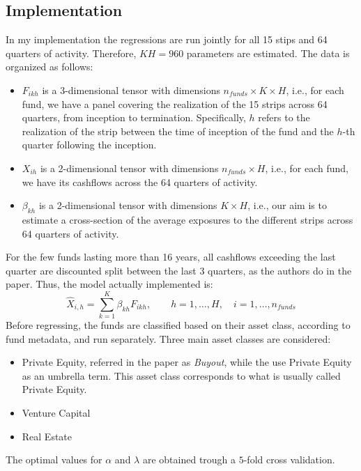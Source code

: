 \documentclass[12pt]{article}
\begin{document}
    \subsection{Implementation}\label{subsec:implementation}
    In my implementation the regressions are run jointly for all 15 stips and 64 quarters of activity.
    Therefore, $KH=960$ parameters are estimated.
    The data is organized as follows:
    \begin{itemize}
        \item $F_{ikh}$ is a 3-dimensional tensor with dimensions $n_{funds} \times K \times H$, i.e., for each fund, we have a panel covering the realization of the 15 strips across 64 quarters, from inception to termination. Specifically, $h$ refers to the realization of the strip between the time of inception of the fund and the $h$-th quarter following the inception.
        \item $X_{ih}$ is a 2-dimensional tensor with dimensions $n_{funds} \times H$, i.e., for each fund, we have its cashflows across the 64 quarters of activity.
        \item $\beta_{kh}$ is a 2-dimensional tensor with dimensions $K \times H$, i.e., our aim is to estimate a cross-section of the average exposures to the different strips across 64 quarters of activity.
    \end{itemize}
    For the few funds lasting more than 16 years, all cashflows exceeding the last quarter are discounted split between the last 3 quarters, as the authors do in the paper.
    Thus, the model actually implemented is:
    \begin{equation}
        \hat X_{i,h} = \sum_{k=1}^K \beta_{kh} F_{ikh} , \qquad h=1,\hdots, H, \quad i = 1, \hdots, n_{funds}
    \end{equation}
    Before regressing, the funds are classified based on their asset class, according to fund metadata, and run separately.
    Three main asset classes are considered:
    \begin{itemize}
        \item Private Equity, referred in the paper as \textit{Buyout}, while the use Private Equity as an umbrella term.
        This asset class corresponds to what is usually called Private Equity.
        \item Venture Capital
        \item Real Estate
    \end{itemize}
    The optimal values for $\alpha$ and $\lambda$ are obtained trough a $5$-fold cross validation.
\end{document}
